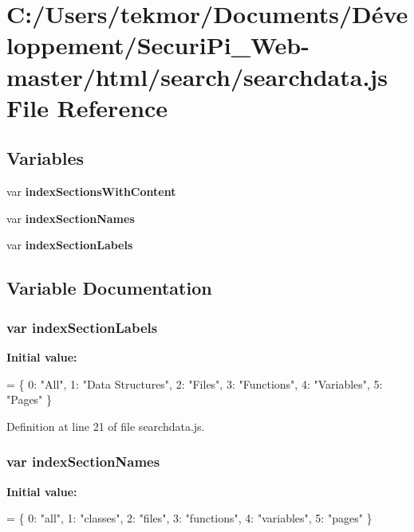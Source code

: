 \section{C\+:/\+Users/tekmor/\+Documents/\+Développement/\+Securi\+Pi\+\_\+\+Web-\/master/html/search/searchdata.js File Reference}
\label{searchdata_8js}
\subsection*{Variables}
\begin{DoxyCompactItemize}
\item 
var {\bf index\+Sections\+With\+Content}
\item 
var {\bf index\+Section\+Names}
\item 
var {\bf index\+Section\+Labels}
\end{DoxyCompactItemize}


\subsection{Variable Documentation}
\subsubsection[{index\+Section\+Labels}]{\setlength{\rightskip}{0pt plus 5cm}var index\+Section\+Labels}\label{searchdata_8js_a529972e449c82dc118cbbd3bcf50c44d}
{\bfseries Initial value\+:}
\begin{DoxyCode}
=
\{
  0: \textcolor{stringliteral}{"All"},
  1: \textcolor{stringliteral}{"Data Structures"},
  2: \textcolor{stringliteral}{"Files"},
  3: \textcolor{stringliteral}{"Functions"},
  4: \textcolor{stringliteral}{"Variables"},
  5: \textcolor{stringliteral}{"Pages"}
\}
\end{DoxyCode}


Definition at line 21 of file searchdata.\+js.

\subsubsection[{index\+Section\+Names}]{\setlength{\rightskip}{0pt plus 5cm}var index\+Section\+Names}\label{searchdata_8js_a77149ceed055c6c6ce40973b5bdc19ad}
{\bfseries Initial value\+:}
\begin{DoxyCode}
=
\{
  0: \textcolor{stringliteral}{"all"},
  1: \textcolor{stringliteral}{"classes"},
  2: \textcolor{stringliteral}{"files"},
  3: \textcolor{stringliteral}{"functions"},
  4: \textcolor{stringliteral}{"variables"},
  5: \textcolor{stringliteral}{"pages"}
\}
\end{DoxyCode}


